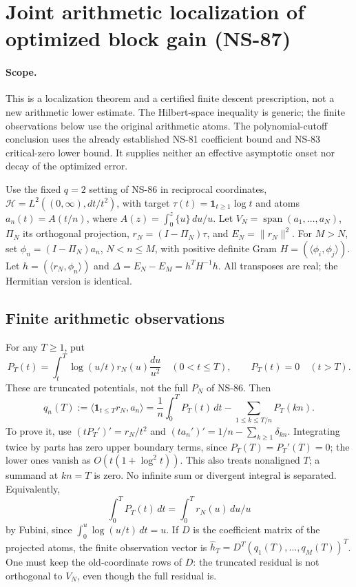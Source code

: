 \section{Joint arithmetic localization of optimized block gain (NS-87)}
\paragraph{Scope.}
This is a localization theorem and a certified finite descent prescription,
not a new arithmetic lower estimate. The Hilbert-space inequality is generic;
the finite observations below use the original arithmetic atoms. The
polynomial-cutoff conclusion uses the already established NS-81 coefficient
bound and NS-83 critical-zero lower bound. It supplies neither an effective
asymptotic onset nor decay of the optimized error.

Use the fixed $q=2$ setting of NS-86 in reciprocal coordinates,
$\mathcal H=L^2((0,\infty),dt/t^2)$, with target
$\tau(t)=\boldsymbol1_{t\ge1}\log t$ and atoms
$a_n(t)=A(t/n)$, where $A(z)=\int_0^z\{u\}\,du/u$.
Let $V_N=\operatorname{span}(a_1,\ldots,a_N)$, $\Pi_N$ its orthogonal
projection, $r_N=(I-\Pi_N)\tau$, and $E_N=\|r_N\|^2$.
For $M>N$, set $\phi_n=(I-\Pi_N)a_n$, $N<n\le M$, with positive definite
Gram $H=(\langle\phi_i,\phi_j\rangle)$. Let
$h=(\langle r_N,\phi_n\rangle)$ and $\Delta=E_N-E_M=h^TH^{-1}h$.
All transposes are real; the Hermitian version is identical.

\subsection{Finite arithmetic observations}
For any $T\ge1$, put
\[
 P_T(t)=\int_t^T\log(u/t)r_N(u)\frac{du}{u^2}\quad(0<t\le T),
 \qquad P_T(t)=0\quad(t>T).
\]
These are truncated potentials, not the full $P_N$ of NS-86. Then
\begin{equation}
 q_n(T):=\langle\boldsymbol1_{t\le T}r_N,a_n\rangle
 =\frac1n\int_0^T P_T(t)\,dt-\sum_{1\le k\le T/n}P_T(kn).
 \label{eq:ns87-finite-quadrature}
\end{equation}
To prove it, use $(tP_T')'=r_N/t^2$ and
$(ta_n')'=1/n-\sum_{k\ge1}\delta_{kn}$. Integrating twice by parts
has zero upper boundary terms, since $P_T(T)=P_T'(T)=0$; the lower
ones vanish as $O(t(1+\log^2t))$. This also treats nonaligned $T$;
a summand at $kn=T$ is zero. No infinite sum or divergent integral is
separated. Equivalently,
\[
 \int_0^T P_T(t)\,dt=\int_0^T r_N(u)\,du/u
\]
by Fubini, since $\int_0^u\log(u/t)\,dt=u$.
If $D$ is the coefficient matrix of the projected atoms, the finite
observation vector is $\widehat h_T=D^T(q_1(T),\ldots,q_M(T))^T$.
One must keep the old-coordinate rows of $D$: the truncated residual is
not orthogonal to $V_N$, even though the full residual is.

